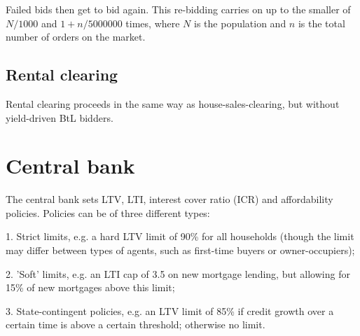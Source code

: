\documentclass{article}
\begin{document}
Failed bids then get to bid again. This re-bidding carries on up to the smaller of $N/1000$ and $1+n/5000000$ times, where $N$ is the population and $n$ is the total number of orders on the market.

\subsection{Rental clearing}

Rental clearing proceeds in the same way as house-sales-clearing, but
without yield-driven BtL bidders.\bigskip

\section{Central bank}

The central bank sets LTV, LTI, interest cover ratio (ICR) and affordability
policies. Policies can be of three different types:

1. Strict limits, e.g. a hard LTV limit of 90\% for all households (though
the limit may differ between types of agents, such as first-time buyers or
owner-occupiers);

2. 'Soft' limits, e.g. an LTI cap of 3.5 on new mortgage lending, but
allowing for 15\% of new mortgages above this limit;

3. State-contingent policies, e.g. an LTV limit of 85\% if credit growth
over a certain time is above a certain threshold; otherwise no limit.
\end{document}
